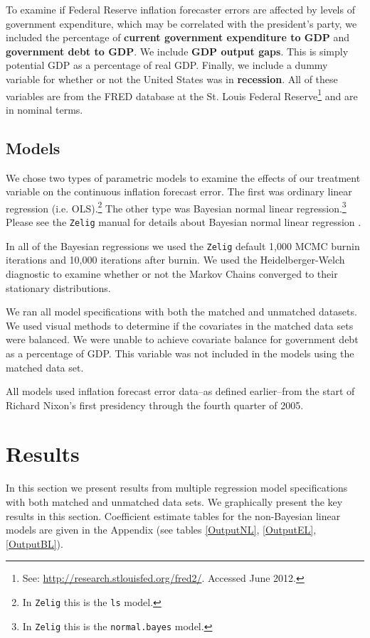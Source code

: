 \documentclass[a4paper]{article}\usepackage{graphicx, color}
\begin{document}
To examine if Federal Reserve inflation forecaster errors are affected by levels of government expenditure, which may be correlated with the president's party, we included the percentage of {\bf{current government expenditure to GDP}} and {\bf{government debt to GDP}}. We include {\bf{GDP output gaps}}. This is simply potential GDP as a percentage of real GDP. Finally, we include a dummy variable for whether or not the United States was in {\bf{recession}}. All of these variables are from the FRED database at the St. Louis Federal Reserve\footnote{See: {\url{http://research.stlouisfed.org/fred2/}}. Accessed June 2012.} and are in nominal terms.

\subsection{Models}

We chose two types of parametric models to examine the effects of our treatment variable on the continuous inflation forecast error. The first was ordinary linear regression (i.e. OLS).\footnote{In {\tt{Zelig}} this is the {\tt{ls}} model.} The other type was Bayesian normal linear regression.\footnote{In {\tt{Zelig}} this is the {\tt{normal.bayes}} model.} Please see the {\tt{Zelig}} manual for details about Bayesian normal linear regression \citep{Goodrich2007}. 

In all of the Bayesian regressions we used the {\tt{Zelig}} default 1,000 MCMC burnin iterations and 10,000 iterations after burnin. We used the Heidelberger-Welch diagnostic to examine whether or not the Markov Chains converged to their stationary distributions.

We ran all model specifications with both the matched and unmatched datasets. We used visual methods to determine if the covariates in the matched data sets were balanced. We were unable to achieve covariate balance for government debt as a percentage of GDP. This variable was not included in the models using the matched data set.

All models used inflation forecast error data--as defined earlier--from the start of Richard Nixon's first presidency through the fourth quarter of 2005. 

\section{Results}

In this section we present results from multiple regression model specifications with both matched and unmatched data sets. We graphically present the key results in this section. Coefficient estimate tables for the non-Bayesian linear models are given in the Appendix (see tables \ref{OutputNL}, \ref{OutputEL}, \ref{OutputBL}).
\end{document}
